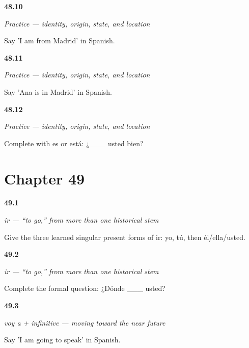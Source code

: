 \noindent\begin{minipage}[t]{\linewidth}
\raggedright
\hypertarget{review-ES-C09-practice-origin}{\textbf{48.10}} \emph{Practice — identity, origin, state, and location}\par
\small Say 'I am from Madrid' in Spanish.
\end{minipage}\par\medskip

\noindent\begin{minipage}[t]{\linewidth}
\raggedright
\hypertarget{review-ES-C09-practice-location}{\textbf{48.11}} \emph{Practice — identity, origin, state, and location}\par
\small Say 'Ana is in Madrid' in Spanish.
\end{minipage}\par\medskip

\noindent\begin{minipage}[t]{\linewidth}
\raggedright
\hypertarget{review-ES-C09-practice-state}{\textbf{48.12}} \emph{Practice — identity, origin, state, and location}\par
\small Complete with es or está: ¿\_\_\_ usted bien?
\end{minipage}\par\medskip

\section*{Chapter 49}

\noindent\begin{minipage}[t]{\linewidth}
\raggedright
\hypertarget{review-ES-C10-ir-singular-forms}{\textbf{49.1}} \emph{ir — “to go,” from more than one historical stem}\par
\small Give the three learned singular present forms of ir: yo, tú, then él/ella/usted.
\end{minipage}\par\medskip

\noindent\begin{minipage}[t]{\linewidth}
\raggedright
\hypertarget{review-ES-C10-ir-formal-question}{\textbf{49.2}} \emph{ir — “to go,” from more than one historical stem}\par
\small Complete the formal question: ¿Dónde \_\_\_ usted?
\end{minipage}\par\medskip

\noindent\begin{minipage}[t]{\linewidth}
\raggedright
\hypertarget{review-ES-C10-ir-a-futuro-voy-hablar}{\textbf{49.3}} \emph{voy a + infinitive — moving toward the near future}\par
\small Say 'I am going to speak' in Spanish.
\end{minipage}\par\medskip

